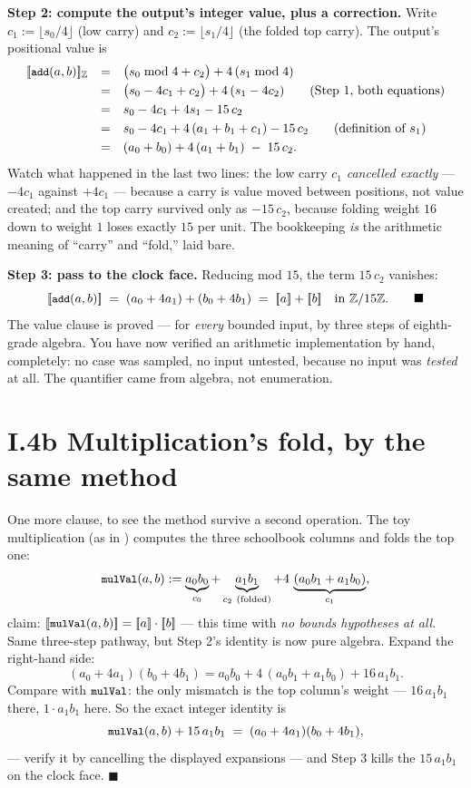 \textbf{Step 2: compute the output's integer value, plus a correction.}
Write $c_1 := \lfloor s_0/4 \rfloor$ (low carry) and
$c_2 := \lfloor s_1/4 \rfloor$ (the folded top carry). The output's
positional value is
\[
\begin{array}{lcl}
\denote{\code{add}(a,b)}_{\Z}
&=& \big( s_0 \bmod 4 + c_2 \big) + 4\,(s_1 \bmod 4)\\[3pt]
&=& \big( s_0 - 4c_1 + c_2 \big) + 4\,( s_1 - 4 c_2 )
    \qquad\text{(Step 1, both equations)}\\[3pt]
&=& s_0 - 4c_1 + 4 s_1 - 15\, c_2\\[3pt]
&=& s_0 - 4c_1 + 4\,( a_1 + b_1 + c_1 ) - 15\,c_2
    \qquad\text{(definition of } s_1\text{)}\\[3pt]
&=& (a_0 + b_0) + 4\,(a_1 + b_1) \;-\; 15\, c_2 .
\end{array}
\]
Watch what happened in the last two lines: the low carry $c_1$
\emph{cancelled exactly} --- $-4c_1$ against $+4c_1$ --- because a carry
is value moved between positions, not value created; and the top carry
survived only as $-15\,c_2$, because folding weight $16$ down to weight
$1$ loses exactly $15$ per unit. The bookkeeping \emph{is} the
arithmetic meaning of ``carry'' and ``fold,'' laid bare.

\textbf{Step 3: pass to the clock face.} Reducing mod $15$, the term
$15\,c_2$ vanishes:
\[
\denote{\code{add}(a,b)}
\;=\; (a_0 + 4a_1) + (b_0 + 4b_1)
\;=\; \denote{a} + \denote{b} \quad\text{in } \Zmod{15}. \qquad\blacksquare
\]
The value clause is proved --- for \emph{every} bounded input, by three
steps of eighth-grade algebra. You have now verified an arithmetic
implementation by hand, completely: no case was sampled, no input
untested, because no input was \emph{tested} at all. The quantifier came
from algebra, not enumeration.

\section*{I.4b \quad Multiplication's fold, by the same method}

One more clause, to see the method survive a second operation. The toy
multiplication (as in ) computes the three
schoolbook columns and folds the top one:
\[
\code{mulVal}(a,b) := \underbrace{a_0 b_0}_{c_0} +
\underbrace{a_1 b_1}_{c_2\ \text{(folded)}} +
4\,\underbrace{(a_0 b_1 + a_1 b_0)}_{c_1},
\]
claim: $\denote{\code{mulVal}(a,b)} = \denote{a}\cdot\denote{b}$ ---
this time with \emph{no bounds hypotheses at all}. Same three-step
pathway, but Step 2's identity is now pure algebra. Expand the
right-hand side:
\[
(a_0 + 4a_1)(b_0 + 4b_1)
= a_0 b_0 + 4\,(a_0 b_1 + a_1 b_0) + 16\, a_1 b_1 .
\]
Compare with $\code{mulVal}$: the only mismatch is the top column's
weight --- $16\,a_1 b_1$ there, $1 \cdot a_1 b_1$ here. So the exact
integer identity is
\[
\code{mulVal}(a,b) + 15\, a_1 b_1 \;=\; (a_0 + 4a_1)(b_0 + 4b_1),
\]
--- verify it by cancelling the displayed expansions --- and Step 3
kills the $15\,a_1 b_1$ on the clock face. $\blacksquare$

